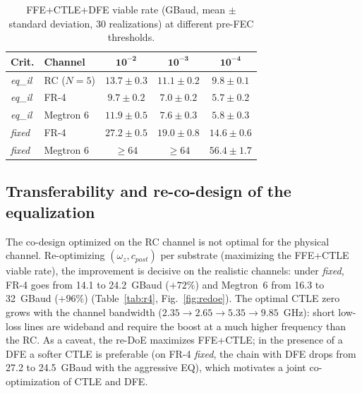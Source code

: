 \documentclass[preprint,review,12pt]{elsarticle}
\begin{document}
\begin{table}[!t]
\caption{FFE+CTLE+DFE viable rate (GBaud, mean $\pm$ standard deviation, 30
realizations) at different pre-FEC thresholds.}
\label{tab:rumbral}\centering
\begin{tabular}{llccc}
\hline
\textbf{Crit.} & \textbf{Channel} & $\mathbf{10^{-2}}$ & $\mathbf{10^{-3}}$ & $\mathbf{10^{-4}}$ \\
\hline
\textit{eq\_il} & RC ($N{=}5$)   & $13.7{\pm}0.3$ & $11.1{\pm}0.2$ & $9.8{\pm}0.1$ \\
\textit{eq\_il} & FR-4           & $9.7{\pm}0.2$  & $7.0{\pm}0.2$  & $5.7{\pm}0.2$ \\
\textit{eq\_il} & Megtron 6      & $11.9{\pm}0.5$ & $7.6{\pm}0.3$  & $5.8{\pm}0.3$ \\
\hline
\textit{fixed}  & FR-4           & $27.2{\pm}0.5$ & $19.0{\pm}0.8$ & $14.6{\pm}0.6$ \\
\textit{fixed}  & Megtron 6      & $\ge 64$       & $\ge 64$       & $56.4{\pm}1.7$ \\
\hline
\end{tabular}
\end{table}

\subsection{Transferability and re-co-design of the equalization}
The co-design optimized on the RC channel is not optimal for the physical
channel. Re-optimizing $(\omega_z, c_{post})$ per substrate (maximizing
the FFE+CTLE viable rate), the improvement is decisive on the realistic
channels: under \textit{fixed}, FR-4 goes from 14.1 to 24.2~GBaud
($+72\%$) and Megtron~6 from 16.3 to 32~GBaud ($+96\%$)
(Table~\ref{tab:r4}, Fig.~\ref{fig:redoe}). The optimal CTLE zero grows
with the channel bandwidth ($2.35\rightarrow2.65\rightarrow5.35\rightarrow
9.85$~GHz): short low-loss lines are wideband and require the boost at a
much higher frequency than the RC. As a caveat, the re-DoE maximizes
FFE+CTLE; in the presence of a DFE a softer CTLE is preferable (on FR-4
\textit{fixed}, the chain with DFE drops from 27.2 to 24.5~GBaud with the
aggressive EQ), which motivates a joint co-optimization of CTLE and DFE.
\end{document}
